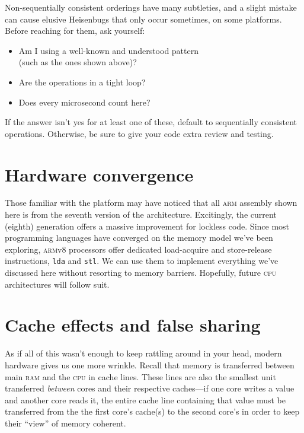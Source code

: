 \documentclass[fontsize=10pt, numbers=endperiod]{scrartcl}
\newcommand{\monobox}[1]{\mbox{\texttt{#1}}}
\newcommand{\keyword}[1]{\monobox{\color{darkGreen}#1}}
\begin{document}
\begin{multicols}{2}
Non-sequentially consistent orderings have many subtleties,
and a slight mistake can cause elusive Heisenbugs that only occur sometimes,
on some platforms.
Before reaching for them, ask yourself:
\begin{itemize}[label={}, before=\itshape]
\item Am I using a well-known and understood pattern \\
      (such as the ones shown above)?
\item Are the operations in a tight loop?
\item Does every microsecond count here?
\end{itemize}
If the answer isn't yes for at least one of these,
default to sequentially consistent operations.
Otherwise, be sure to give your code extra review and testing.

\section{Hardware convergence}

Those familiar with the platform may have noticed that all \textsc{arm} assembly
shown here is from the seventh version of the architecture.
Excitingly, the current (eighth) generation offers a massive
improvement for lockless code.
Since most programming languages have converged on the memory model we've been
exploring, \textsc{arm}v8 processors offer dedicated load-acquire
and store-release instructions, \keyword{lda} and \keyword{stl}.
We can use them to implement everything we've discussed here without
resorting to memory barriers.
Hopefully, future \textsc{cpu} architectures will follow suit.

\section{Cache effects and false sharing}

As if all of this wasn't enough to keep rattling around in your head,
modern hardware gives us one more wrinkle.
Recall that memory is transferred between main \textsc{ram} and the \textsc{cpu}
in cache lines.
These lines are also the smallest unit transferred
\emph{between} cores and their respective caches---if one core writes a value
and another core reads it, the entire cache line containing that value must be
transferred from the the first core's cache(s) to the second core's in order to
keep their ``view'' of memory coherent.


\end{multicols}
\end{document}
